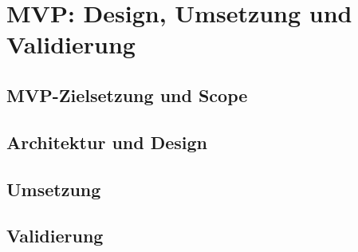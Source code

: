 \section{MVP: Design, Umsetzung und Validierung}

\subsection{MVP-Zielsetzung und Scope}

\subsection{Architektur und Design}

\subsection{Umsetzung}

\subsection{Validierung}
